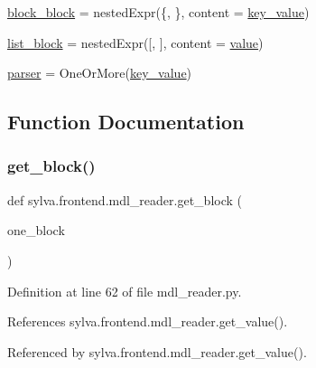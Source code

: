 \begin{DoxyCompactItemize}
\item 
\hyperlink{namespacesylva_1_1frontend_1_1mdl__reader_ab48e53340e0d8180cc9ac1c1636be161}{block\+\_\+block} = nested\+Expr(\textquotesingle{}\{\textquotesingle{}, \textquotesingle{}\}\textquotesingle{}, content = \hyperlink{namespacesylva_1_1frontend_1_1mdl__reader_ab486fd03c0920f56c3256072a68fa07e}{key\+\_\+value})
\item 
\hyperlink{namespacesylva_1_1frontend_1_1mdl__reader_a581827bbd8604fbac7778f6f999f002a}{list\+\_\+block} = nested\+Expr(\textquotesingle{}\mbox{[}\textquotesingle{}, \textquotesingle{}\mbox{]}\textquotesingle{}, content = \hyperlink{namespacesylva_1_1frontend_1_1mdl__reader_a20dbd52811dc7d7916a801d1b8cc772e}{value})
\item 
\hyperlink{namespacesylva_1_1frontend_1_1mdl__reader_aa76cab99625dd105ca447bfe4fde226d}{parser} = One\+Or\+More(\hyperlink{namespacesylva_1_1frontend_1_1mdl__reader_ab486fd03c0920f56c3256072a68fa07e}{key\+\_\+value})
\end{DoxyCompactItemize}


\subsection{Function Documentation}
\mbox{\label{namespacesylva_1_1frontend_1_1mdl__reader_ab87bbf99474762b7a54620e20adfddc2}} 
\subsubsection{\texorpdfstring{get\+\_\+block()}{get\_block()}}
{\footnotesize\ttfamily def sylva.\+frontend.\+mdl\+\_\+reader.\+get\+\_\+block (\begin{DoxyParamCaption}\item[{}]{one\+\_\+block }\end{DoxyParamCaption})}



Definition at line 62 of file mdl\+\_\+reader.\+py.



References sylva.\+frontend.\+mdl\+\_\+reader.\+get\+\_\+value().



Referenced by sylva.\+frontend.\+mdl\+\_\+reader.\+get\+\_\+value().


